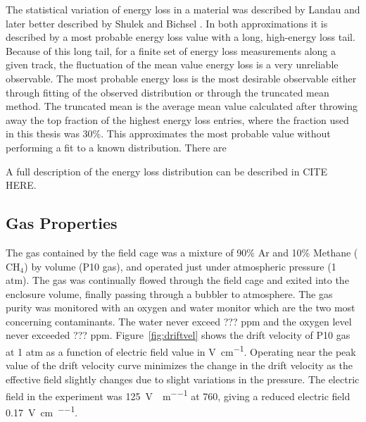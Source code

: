 The statistical variation of energy loss in a material was described by Landau \cite{landau} and later better described by Shulek \cite{shulek} and Bichsel \cite{bichsel1}. In both approximations it is described by a most probable energy loss value with a long, high-energy loss tail. Because of this long tail, for a finite set of energy loss measurements along a given track, the fluctuation of the mean value energy loss is a very unreliable observable. The most probable energy loss is the most desirable observable either through fitting of the observed distribution or through the truncated mean method. The truncated mean is the average mean value calculated after throwing away the top fraction of the highest energy loss entries, where the fraction used in this thesis was 30\%. This approximates the most probable value without performing a fit to a known distribution. There are 




 A full description of the energy loss distribution can be described in CITE HERE.


\subsection{Gas Properties}
The gas contained by the field cage was a mixture of 90\% Ar and 10\% Methane ($\mathrm{CH_4}$) by volume (P10 gas), and operated just under atmospheric pressure (1 atm). The  gas was continually flowed through the field cage and exited into the enclosure volume, finally passing through a bubbler to atmosphere. The gas purity was monitored with an oxygen and water monitor which are the two most concerning contaminants. The water never exceed  ??? ppm  and the oxygen level never exceeded ??? ppm. Figure~\ref{fig:driftvel} shows the drift velocity of P10 gas at 1 atm as a function of electric field value in \si{\volt\per\centi\metre}. Operating near the peak value of the drift velocity curve minimizes the change in the drift velocity as the effective field slightly changes due to slight variations in the pressure. The electric field in the experiment was \SI{125}{\volt\per\centi\per\metre} at \SI{760}{\torr}, giving a reduced electric field \SI{0.17}{\volt\per\centi\metre\per\torr}.

